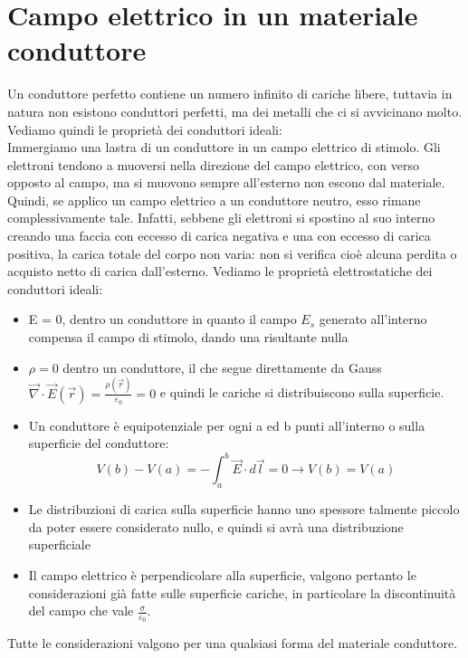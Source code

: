 \documentclass{book}
\begin{document}
\section{Campo elettrico in un materiale conduttore}
Un conduttore perfetto contiene un numero infinito di cariche libere, tuttavia in natura non esistono conduttori perfetti, ma dei metalli che ci si avvicinano molto.
Vediamo quindi le proprietà dei conduttori ideali: 
\\ 
Immergiamo una lastra di un conduttore in un campo elettrico di stimolo.
Gli elettroni tendono a muoversi nella direzione del campo elettrico, con verso opposto al campo, ma si muovono sempre all'esterno non escono dal materiale. 
\\
Quindi, se applico un campo elettrico a un conduttore neutro, esso rimane complessivamente tale. Infatti, sebbene gli elettroni si spostino al suo interno creando una faccia con eccesso di carica negativa e una con eccesso di carica positiva, la carica totale del corpo non varia: non si verifica cioè alcuna perdita o acquisto netto di carica dall'esterno. Vediamo le proprietà elettrostatiche dei conduttori ideali:
\begin{itemize}
    \item E = 0, dentro un conduttore in quanto il campo $E_s$ generato  all'interno compensa il campo di stimolo, dando una risultante nulla 
    \item $\rho=0$ dentro un conduttore, il che segue direttamente da Gauss $\vec{\nabla}\cdot\vec{E}(\vec{r}) = \frac{\rho(\vec{r})}{\varepsilon_0}=0$ e quindi le cariche si distribuiscono sulla superficie.
    \item Un conduttore è equipotenziale per ogni a ed b punti all'interno o sulla superficie del conduttore: 
    $$ V(b)-V(a) = -\int_{a}^{b} \vec{E}\cdot d\vec{l}  = 0\to V(b)=V(a)$$
    \item Le distribuzioni di carica sulla superficie hanno uno spessore talmente piccolo da poter essere considerato nullo, e quindi si avrà una distribuzione superficiale
    \item Il campo elettrico è perpendicolare alla superficie, valgono pertanto le considerazioni già fatte sulle superficie cariche, in particolare la discontinuità del campo che vale $\frac{\sigma}{\varepsilon_0}$.
\end{itemize}
Tutte le considerazioni valgono per una qualsiasi forma del materiale conduttore.
 
\end{document}
